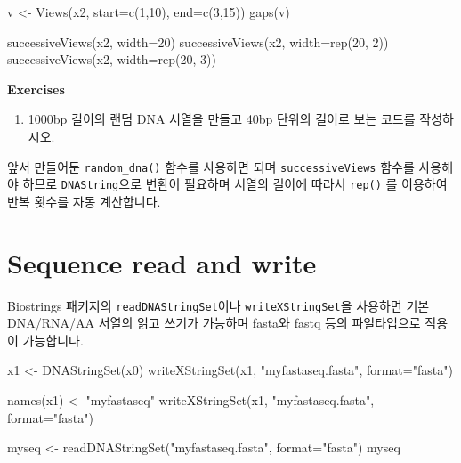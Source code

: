 \documentclass[
]{book}
\newenvironment{Shaded}{\begin{snugshade}}{\end{snugshade}}
\newcommand{\AttributeTok}[1]{\textcolor[rgb]{0.77,0.63,0.00}{#1}}
\newcommand{\DecValTok}[1]{\textcolor[rgb]{0.00,0.00,0.81}{#1}}
\newcommand{\FunctionTok}[1]{\textcolor[rgb]{0.00,0.00,0.00}{#1}}
\newcommand{\NormalTok}[1]{#1}
\newcommand{\OtherTok}[1]{\textcolor[rgb]{0.56,0.35,0.01}{#1}}
\newcommand{\StringTok}[1]{\textcolor[rgb]{0.31,0.60,0.02}{#1}}
\providecommand{\tightlist}{%
  \setlength{\itemsep}{0pt}\setlength{\parskip}{0pt}}
\begin{document}
\begin{Shaded}
\begin{Highlighting}[]
\NormalTok{v }\OtherTok{\textless{}{-}} \FunctionTok{Views}\NormalTok{(x2, }\AttributeTok{start=}\FunctionTok{c}\NormalTok{(}\DecValTok{1}\NormalTok{,}\DecValTok{10}\NormalTok{), }\AttributeTok{end=}\FunctionTok{c}\NormalTok{(}\DecValTok{3}\NormalTok{,}\DecValTok{15}\NormalTok{))}
\FunctionTok{gaps}\NormalTok{(v)}

\FunctionTok{successiveViews}\NormalTok{(x2, }\AttributeTok{width=}\DecValTok{20}\NormalTok{)}
\FunctionTok{successiveViews}\NormalTok{(x2, }\AttributeTok{width=}\FunctionTok{rep}\NormalTok{(}\DecValTok{20}\NormalTok{, }\DecValTok{2}\NormalTok{))}
\FunctionTok{successiveViews}\NormalTok{(x2, }\AttributeTok{width=}\FunctionTok{rep}\NormalTok{(}\DecValTok{20}\NormalTok{, }\DecValTok{3}\NormalTok{))}
\end{Highlighting}
\end{Shaded}

\textbf{Exercises }

\begin{enumerate}
\def\labelenumi{\arabic{enumi}.}
\tightlist
\item
  1000bp 길이의 랜덤 DNA 서열을 만들고 40bp 단위의 길이로 보는 코드를 작성하시오.
\end{enumerate}

앞서 만들어둔 \texttt{random\_dna()} 함수를 사용하면 되며 \texttt{successiveViews} 함수를 사용해야 하므로 \texttt{DNAString}으로 변환이 필요하며 서열의 길이에 따라서 \texttt{rep()} 를 이용하여 반복 횟수를 자동 계산합니다.

\hypertarget{sequence-read-and-write}{%
\section{Sequence read and write}\label{sequence-read-and-write}}

Biostrings 패키지의 \texttt{readDNAStringSet}이나 \texttt{writeXStringSet}을 사용하면 기본 DNA/RNA/AA 서열의 읽고 쓰기가 가능하며 fasta와 fastq 등의 파일타입으로 적용이 가능합니다.

\begin{Shaded}
\begin{Highlighting}[]
\NormalTok{x1 }\OtherTok{\textless{}{-}} \FunctionTok{DNAStringSet}\NormalTok{(x0)}
\FunctionTok{writeXStringSet}\NormalTok{(x1, }\StringTok{"myfastaseq.fasta"}\NormalTok{, }\AttributeTok{format=}\StringTok{"fasta"}\NormalTok{)}

\FunctionTok{names}\NormalTok{(x1) }\OtherTok{\textless{}{-}} \StringTok{"myfastaseq"}
\FunctionTok{writeXStringSet}\NormalTok{(x1, }\StringTok{"myfastaseq.fasta"}\NormalTok{, }\AttributeTok{format=}\StringTok{"fasta"}\NormalTok{)}

\NormalTok{myseq }\OtherTok{\textless{}{-}} \FunctionTok{readDNAStringSet}\NormalTok{(}\StringTok{"myfastaseq.fasta"}\NormalTok{, }\AttributeTok{format=}\StringTok{"fasta"}\NormalTok{)}
\NormalTok{myseq}
\end{Highlighting}
\end{Shaded}
\end{document}
